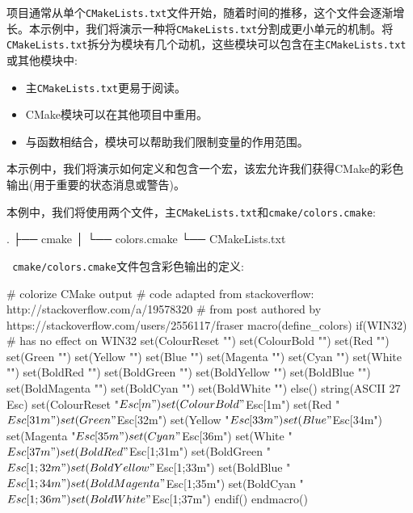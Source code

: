 项目通常从单个\texttt{CMakeLists.txt}文件开始，随着时间的推移，这个文件会逐渐增长。本示例中，我们将演示一种将\texttt{CMakeLists.txt}分割成更小单元的机制。将\texttt{CMakeLists.txt}拆分为模块有几个动机，这些模块可以包含在主\texttt{CMakeLists.txt}或其他模块中:

\begin{itemize}
\item 主\texttt{CMakeLists.txt}更易于阅读。

\item CMake模块可以在其他项目中重用。

\item 与函数相结合，模块可以帮助我们限制变量的作用范围。

\end{itemize}

本示例中，我们将演示如何定义和包含一个宏，该宏允许我们获得CMake的彩色输出(用于重要的状态消息或警告)。


本例中，我们将使用两个文件，主\texttt{CMakeLists.txt}和\texttt{cmake/colors.cmake}:

\begin{codebox}[shell]
.
├── cmake
│     └── colors.cmake
└── CMakeLists.txt
\end{codebox}

\texttt{ cmake/colors.cmake}文件包含彩色输出的定义:

\begin{codebox}[cmake]
# colorize CMake output
# code adapted from stackoverflow: http://stackoverflow.com/a/19578320
# from post authored by https://stackoverflow.com/users/2556117/fraser
macro(define_colors)
  if(WIN32)
    # has no effect on WIN32
    set(ColourReset "")
    set(ColourBold "")
    set(Red "")
    set(Green "")
    set(Yellow "")
    set(Blue "")
    set(Magenta "")
    set(Cyan "")
    set(White "")
    set(BoldRed "")
    set(BoldGreen "")
    set(BoldYellow "")
    set(BoldBlue "")
    set(BoldMagenta "")
    set(BoldCyan "")
    set(BoldWhite "")
  else()
    string(ASCII 27 Esc)
    set(ColourReset "${Esc}[m")
    set(ColourBold "${Esc}[1m")
    set(Red "${Esc}[31m")
    set(Green "${Esc}[32m")
    set(Yellow "${Esc}[33m")
    set(Blue "${Esc}[34m")
    set(Magenta "${Esc}[35m")
    set(Cyan "${Esc}[36m")
    set(White "${Esc}[37m")
    set(BoldRed "${Esc}[1;31m")
    set(BoldGreen "${Esc}[1;32m")
    set(BoldYellow "${Esc}[1;33m")
    set(BoldBlue "${Esc}[1;34m")
    set(BoldMagenta "${Esc}[1;35m")
    set(BoldCyan "${Esc}[1;36m")
    set(BoldWhite "${Esc}[1;37m")
  endif()
endmacro()
\end{codebox}

